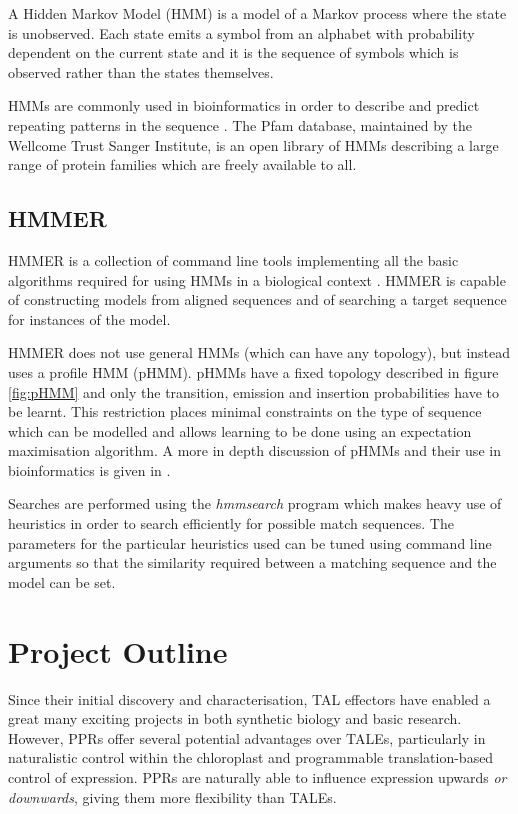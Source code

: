 A Hidden Markov Model (HMM) is a model of a Markov process where the state is
unobserved.
Each state emits a symbol from an alphabet with probability dependent on the 
current state and it is the sequence of symbols which is observed rather than
the states themselves. 

HMMs are commonly used in bioinformatics in order to describe and predict
repeating patterns in the sequence \citep{Durbin1998}.
The Pfam database, maintained by the Wellcome Trust Sanger Institute,
is an open library of HMMs describing a large range of protein families which
are freely available to all.

\subsection{HMMER}
\label{ssec:hmmer}

HMMER is a collection of command line tools implementing all the basic
algorithms required for using HMMs in a biological context \citep{HMMERguide}.
HMMER is capable of constructing models from aligned sequences and of searching
a target sequence for instances of the model.

HMMER does not use general HMMs (which can have any topology), but instead uses
a profile HMM (pHMM).
pHMMs have a fixed topology described in figure \ref{fig:pHMM} and only the 
transition, emission and insertion probabilities have to be learnt.
This restriction places minimal constraints on the type of sequence which can
be modelled and allows learning to be done using an expectation maximisation
algorithm. A more in depth discussion of pHMMs and their use in bioinformatics
is given in \citep{Durbin1998}.

Searches are performed using the \emph{hmmsearch} program which makes heavy use
of heuristics in order to search efficiently for possible match sequences.
The parameters for the particular heuristics used can be tuned using command
line arguments so that the similarity required between a matching sequence 
and the model can be set.

\section{Project Outline}

Since their initial discovery and characterisation, TAL effectors have enabled
a great many exciting projects in both synthetic biology and basic research.
However, PPRs offer several potential advantages over TALEs, particularly in 
naturalistic control within the chloroplast and programmable translation-based 
control of expression.
PPRs are naturally able to influence expression upwards \emph{or downwards},
giving them more flexibility than TALEs.

